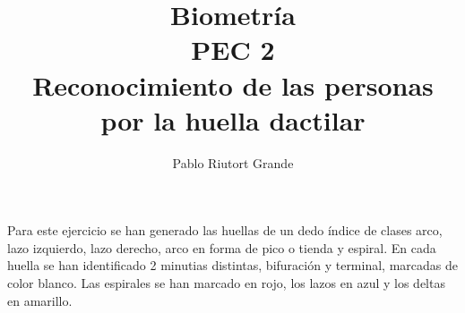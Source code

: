 \documentclass[10pt,a4paper]{article}
\author{Pablo Riutort Grande}
\title{Biometría \\\vspace{0.3cm}PEC 2\\ \vspace{1cm}\textbf{Reconocimiento de las personas por la huella dactilar}}
\begin{document}
\maketitle

\pagebreak

\listoffigures
\listoftables
\pagebreak
\section{}
\subsection{}
Para este ejercicio se han generado las huellas de un dedo índice de clases arco, lazo izquierdo, lazo derecho, arco en forma de pico o tienda y espiral. En cada huella se han identificado 2 minutias distintas, bifuración y terminal, marcadas de color blanco. Las espirales se han marcado en rojo, los lazos en azul y los deltas en amarillo.
\end{document}
